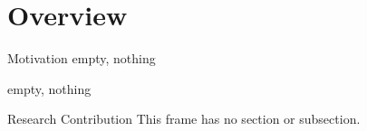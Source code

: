 \section{Overview}

\begin{frame}{Motivation}
  empty, nothing
\end{frame}

\begin{frame}
  empty, nothing
\end{frame}

\begin{frame}{Research Contribution}
  This frame has no section or subsection.
\end{frame}